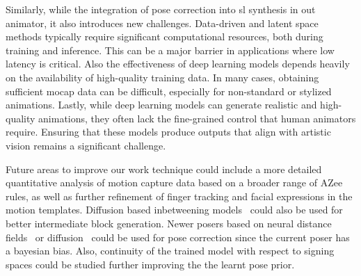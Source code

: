 \documentclass[../../main.tex]{subfiles}
\begin{document}
Similarly, while the integration of pose correction into \gls{sl} synthesis in out animator, it also introduces new challenges. Data-driven and latent space methods typically require significant computational resources, both during training and inference. This can be a major barrier in applications where low latency is critical. Also the effectiveness of deep learning models depends heavily on the availability of high-quality training data. In many cases, obtaining sufficient mocap data can be difficult, especially for non-standard or stylized animations. Lastly, while deep learning models can generate realistic and high-quality animations, they often lack the fine-grained control that human animators require. Ensuring that these models produce outputs that align with artistic vision remains a significant challenge.

Future areas to improve our work technique could include a more detailed quantitative analysis of motion capture data based on a broader range of AZee rules, as well as further refinement of finger tracking and facial expressions in the motion templates. Diffusion based inbetweening models~\cite{cohan2024flexible} could also be used for better intermediate block generation. Newer posers based on neural distance fields~\cite{tiwari2022pose} or diffusion~\cite{lu2023dposer} could be used for pose correction since the current poser has a bayesian bias. Also, continuity of the trained model with respect to signing spaces could be studied further improving the the learnt pose prior.
\end{document}
